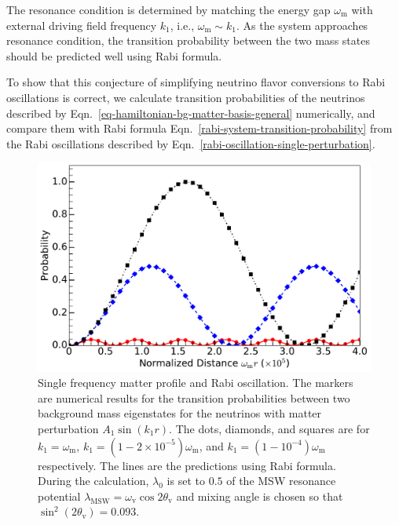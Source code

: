 The resonance condition is determined by matching the energy gap $\omega_{\mathrm m}$ with external driving field frequency $k_1$, i.e., $\omega_{\mathrm m} \sim k_1$. As the system approaches resonance condition, the transition probability between the two mass states should be predicted well using Rabi formula.

To show that this conjecture of simplifying neutrino flavor conversions to Rabi oscillations is correct, we calculate transition probabilities of the neutrinos described by Eqn.~\ref{eq-hamiltonian-bg-matter-basis-general} numerically, and compare them with Rabi formula Eqn.~\ref{rabi-system-transition-probability} from the Rabi oscillations described by Eqn.~\ref{rabi-oscillation-single-perturbation}.



\begin{figure}[!htbp]
                \includegraphics[width=\columnwidth]{chapters/assets/rabi/rabiOscillationsNeutrinoCoincidence-single-frequency}
                \caption{Single frequency matter profile and Rabi oscillation. The markers are numerical results for the transition probabilities between two background mass eigenstates for the neutrinos with matter perturbation $A_1\sin(k_1 r)$. The dots, diamonds, and squares are for $k_1=\omega_{\mathrm m}$, $k_1=(1-2\times 10^{-5})\omega_{\mathrm m}$, and $k_1=(1-10^{-4})\omega_{\mathrm m}$ respectively. The lines are the predictions using Rabi formula. During the calculation, $\lambda_0$ is set to $0.5$ of the MSW resonance potential $\lambda_{\mathrm{MSW}}=\omega_{\mathrm{v}}\cos 2\theta_{\mathrm v}$ and mixing angle is chosen so that $\sin^2(2\theta_{\mathrm v}) = 0.093$.}
                \label{fig-rabiOscillationsNeutrinoCoincidence}
\end{figure}

